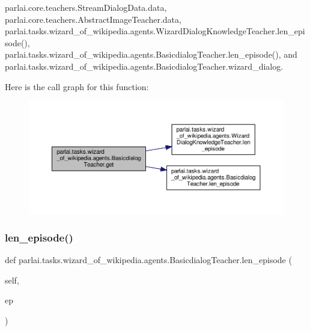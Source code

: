 parlai.\+core.\+teachers.\+Stream\+Dialog\+Data.\+data, parlai.\+core.\+teachers.\+Abstract\+Image\+Teacher.\+data, parlai.\+tasks.\+wizard\+\_\+of\+\_\+wikipedia.\+agents.\+Wizard\+Dialog\+Knowledge\+Teacher.\+len\+\_\+episode(), parlai.\+tasks.\+wizard\+\_\+of\+\_\+wikipedia.\+agents.\+Basicdialog\+Teacher.\+len\+\_\+episode(), and parlai.\+tasks.\+wizard\+\_\+of\+\_\+wikipedia.\+agents.\+Basicdialog\+Teacher.\+wizard\+\_\+dialog.

Here is the call graph for this function\+:
\nopagebreak
\begin{figure}[H]
\begin{center}
\leavevmode
\includegraphics[width=350pt]{classparlai_1_1tasks_1_1wizard__of__wikipedia_1_1agents_1_1BasicdialogTeacher_ae457e3f6ba55bc18191d0fbcc4b408a1_cgraph}
\end{center}
\end{figure}
\mbox{\label{classparlai_1_1tasks_1_1wizard__of__wikipedia_1_1agents_1_1BasicdialogTeacher_a2557378cd9519f4596b2fcc713698056}} 
\subsubsection{\texorpdfstring{len\+\_\+episode()}{len\_episode()}}
{\footnotesize\ttfamily def parlai.\+tasks.\+wizard\+\_\+of\+\_\+wikipedia.\+agents.\+Basicdialog\+Teacher.\+len\+\_\+episode (\begin{DoxyParamCaption}\item[{}]{self,  }\item[{}]{ep }\end{DoxyParamCaption})}



